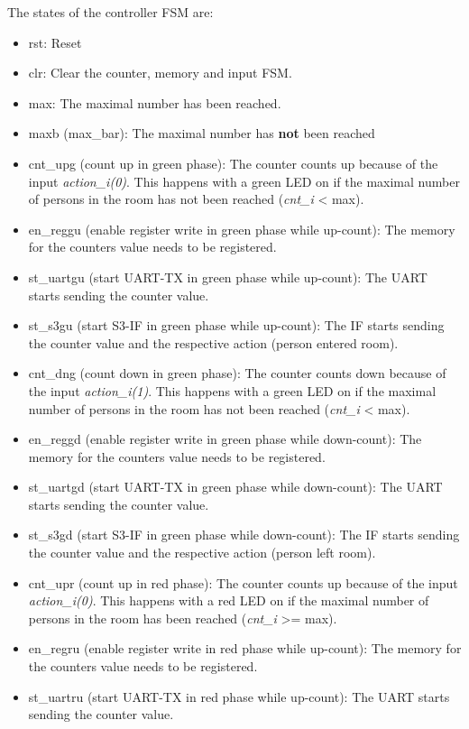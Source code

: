 The states of the controller FSM are:
\begin{itemize}
  \item rst: Reset
  \item clr: Clear the counter, memory and input FSM.
  \item max: The maximal number has been reached.
  \item maxb (max\_bar): The maximal number has \textbf{not} been reached
  \item cnt\_upg (count up in green phase): The counter counts up because of the input \textit{action\_i(0)}. This happens with a green LED on if the maximal number of persons in the room has not been reached (\textit{cnt\_i} < max).
  \item en\_reggu (enable register write in green phase while up-count): The memory for the counters value needs to be registered.
  \item st\_uartgu (start UART-TX in green phase while up-count): The UART starts sending the counter value.
  \item st\_s3gu (start S3-IF in green phase while up-count): The IF starts sending the counter value and the respective action (person entered room).
  \item cnt\_dng (count down in green phase): The counter counts down because of the input \textit{action\_i(1)}. This happens with a green LED on if the maximal number of persons in the room has not been reached (\textit{cnt\_i} < max).
   \item en\_reggd (enable register write in green phase while down-count): The memory for the counters value needs to be registered.
  \item st\_uartgd (start UART-TX in green phase while down-count): The UART starts sending the counter value.
  \item st\_s3gd (start S3-IF in green phase while down-count): The IF starts sending the counter value and the respective action (person left room).
  \item cnt\_upr (count up in red phase): The counter counts up because of the input \textit{action\_i(0)}. This happens with a red LED on if the maximal number of persons in the room has been reached (\textit{cnt\_i} >= max).
  \item en\_regru (enable register write in red phase while up-count): The memory for the counters value needs to be registered.
  \item st\_uartru (start UART-TX in red phase while up-count): The UART starts sending the counter value.

\end{itemize}

